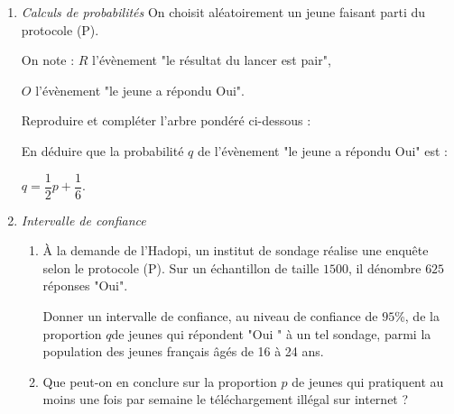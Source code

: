 \begin{enumerate}
     \item
     \textit{Calculs de probabilités}
     On choisit aléatoirement un jeune faisant parti du protocole (P).
     \par
     On note : $R$ l'évènement "le résultat du lancer est pair",
     \par
     $O$ l'évènement "le jeune a répondu Oui".
     \par
     Reproduire et compléter l'arbre pondéré ci-dessous :
\begin{center}
\end{center}
     En déduire que la probabilité $q$ de l'évènement "le jeune a répondu Oui" est :
     \begin{center}$q = \dfrac{1}{2}p+\dfrac{1}{6}.$\end{center}
     \item
     \textit{Intervalle de confiance}
     \begin{enumerate}[label=\alph*.]
          \item
          À la demande de l'Hadopi, un institut de sondage réalise une enquête selon le protocole (P). Sur un échantillon de taille $1500$, il dénombre $625$ réponses "Oui".
          \par
          Donner un intervalle de confiance, au niveau de confiance de $95$\%, de la proportion $q$de jeunes qui répondent "Oui " à un tel sondage, parmi la population des jeunes français âgés de 16 à 24 ans.
          \item
          Que peut-on en conclure sur la proportion $p$ de jeunes qui pratiquent au moins une fois par semaine le téléchargement illégal sur internet ?
     \end{enumerate}
\end{enumerate}
